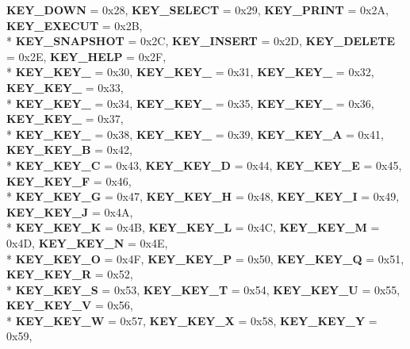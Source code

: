 \begin{DoxyCompactItemize}
{\bfseries K\+E\+Y\+\_\+\+D\+O\+WN} = 0x28, 
{\bfseries K\+E\+Y\+\_\+\+S\+E\+L\+E\+CT} = 0x29, 
{\bfseries K\+E\+Y\+\_\+\+P\+R\+I\+NT} = 0x2A, 
{\bfseries K\+E\+Y\+\_\+\+E\+X\+E\+C\+UT} = 0x2B, 
\\*
{\bfseries K\+E\+Y\+\_\+\+S\+N\+A\+P\+S\+H\+OT} = 0x2C, 
{\bfseries K\+E\+Y\+\_\+\+I\+N\+S\+E\+RT} = 0x2D, 
{\bfseries K\+E\+Y\+\_\+\+D\+E\+L\+E\+TE} = 0x2E, 
{\bfseries K\+E\+Y\+\_\+\+H\+E\+LP} = 0x2F, 
\\*
{\bfseries K\+E\+Y\+\_\+\+K\+E\+Y\+\_} = 0x30, 
{\bfseries K\+E\+Y\+\_\+\+K\+E\+Y\+\_} = 0x31, 
{\bfseries K\+E\+Y\+\_\+\+K\+E\+Y\+\_} = 0x32, 
{\bfseries K\+E\+Y\+\_\+\+K\+E\+Y\+\_} = 0x33, 
\\*
{\bfseries K\+E\+Y\+\_\+\+K\+E\+Y\+\_} = 0x34, 
{\bfseries K\+E\+Y\+\_\+\+K\+E\+Y\+\_} = 0x35, 
{\bfseries K\+E\+Y\+\_\+\+K\+E\+Y\+\_} = 0x36, 
{\bfseries K\+E\+Y\+\_\+\+K\+E\+Y\+\_} = 0x37, 
\\*
{\bfseries K\+E\+Y\+\_\+\+K\+E\+Y\+\_} = 0x38, 
{\bfseries K\+E\+Y\+\_\+\+K\+E\+Y\+\_} = 0x39, 
{\bfseries K\+E\+Y\+\_\+\+K\+E\+Y\+\_\+A} = 0x41, 
{\bfseries K\+E\+Y\+\_\+\+K\+E\+Y\+\_\+B} = 0x42, 
\\*
{\bfseries K\+E\+Y\+\_\+\+K\+E\+Y\+\_\+C} = 0x43, 
{\bfseries K\+E\+Y\+\_\+\+K\+E\+Y\+\_\+D} = 0x44, 
{\bfseries K\+E\+Y\+\_\+\+K\+E\+Y\+\_\+E} = 0x45, 
{\bfseries K\+E\+Y\+\_\+\+K\+E\+Y\+\_\+F} = 0x46, 
\\*
{\bfseries K\+E\+Y\+\_\+\+K\+E\+Y\+\_\+G} = 0x47, 
{\bfseries K\+E\+Y\+\_\+\+K\+E\+Y\+\_\+H} = 0x48, 
{\bfseries K\+E\+Y\+\_\+\+K\+E\+Y\+\_\+I} = 0x49, 
{\bfseries K\+E\+Y\+\_\+\+K\+E\+Y\+\_\+J} = 0x4A, 
\\*
{\bfseries K\+E\+Y\+\_\+\+K\+E\+Y\+\_\+K} = 0x4B, 
{\bfseries K\+E\+Y\+\_\+\+K\+E\+Y\+\_\+L} = 0x4C, 
{\bfseries K\+E\+Y\+\_\+\+K\+E\+Y\+\_\+M} = 0x4D, 
{\bfseries K\+E\+Y\+\_\+\+K\+E\+Y\+\_\+N} = 0x4E, 
\\*
{\bfseries K\+E\+Y\+\_\+\+K\+E\+Y\+\_\+O} = 0x4F, 
{\bfseries K\+E\+Y\+\_\+\+K\+E\+Y\+\_\+P} = 0x50, 
{\bfseries K\+E\+Y\+\_\+\+K\+E\+Y\+\_\+Q} = 0x51, 
{\bfseries K\+E\+Y\+\_\+\+K\+E\+Y\+\_\+R} = 0x52, 
\\*
{\bfseries K\+E\+Y\+\_\+\+K\+E\+Y\+\_\+S} = 0x53, 
{\bfseries K\+E\+Y\+\_\+\+K\+E\+Y\+\_\+T} = 0x54, 
{\bfseries K\+E\+Y\+\_\+\+K\+E\+Y\+\_\+U} = 0x55, 
{\bfseries K\+E\+Y\+\_\+\+K\+E\+Y\+\_\+V} = 0x56, 
\\*
{\bfseries K\+E\+Y\+\_\+\+K\+E\+Y\+\_\+W} = 0x57, 
{\bfseries K\+E\+Y\+\_\+\+K\+E\+Y\+\_\+X} = 0x58, 
{\bfseries K\+E\+Y\+\_\+\+K\+E\+Y\+\_\+Y} = 0x59, 

\end{DoxyCompactItemize}
